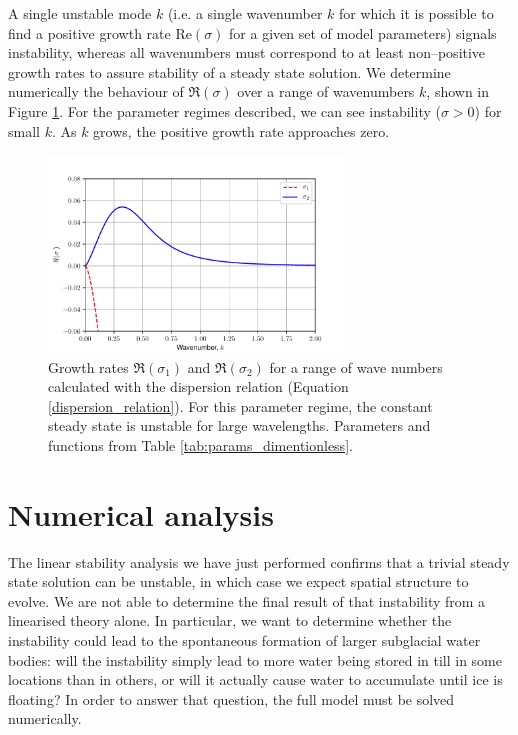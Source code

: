 \documentclass[journal abbreviation, manuscript]{copernicus}
\begin{document}
A single unstable mode $k$ (i.e. a single wavenumber $k$ for 
which it is possible to find a positive growth rate 
$\mathrm{Re}(\sigma)$ for a given set of model parameters) signals 
instability, whereas all wavenumbers must correspond to at least 
non--positive growth rates to assure stability of a steady state solution.
We determine 
numerically the behaviour of $\Re(\sigma)$ over a range of wavenumbers $k$, shown in Figure \ref{fig:sigma_instability}.  
For the parameter regimes described, we can see instability ($\sigma > 0$) for small $k$.  As $k$ grows, the positive growth rate approaches zero. 



\begin{figure}[htb!]
\centering
\includegraphics[width=0.7\textwidth]{pictures/dispersion_relation.pdf}
\caption[Growth rates from dispersion relation]{Growth rates $\Re (\sigma_1)$ and $\Re( \sigma_2)$ for a range of wave numbers calculated with the dispersion relation (Equation \eqref{dispersion_relation}). For this parameter regime, the constant steady state is unstable for large wavelengths. Parameters and functions from Table \ref{tab:params_dimentionless}.}
\label{fig:sigma_instability}
\end{figure}


\section{Numerical analysis} \label{sec:numerics}

The linear stability analysis we have just performed confirms that a 
trivial steady state solution can be unstable, in which case we expect 
spatial structure to evolve. We are not able to determine the final 
result of that instability from a linearised theory alone. In 
particular, we want to determine whether the instability could lead to 
the spontaneous formation of larger subglacial water bodies: will the 
instability simply lead to more water being stored in till in some 
locations than in others, or will it actually cause water to accumulate until ice is floating? In order to answer that 
question, the full model must be solved 
numerically. 
\end{document}
